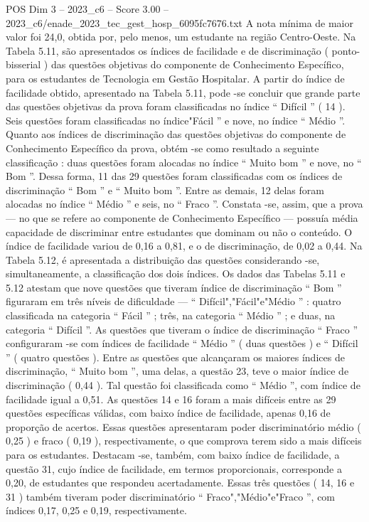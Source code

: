 \begin{textsample}{POS Dim 3 – 2023\_c6 – Score 3.00 – 2023\_c6/enade\_2023\_tec\_gest\_hosp\_6095fc7676.txt}
A nota mínima de maior valor foi 24,0, obtida por, pelo menos, um estudante na região Centro-Oeste.
Na Tabela 5.11, são apresentados os índices de facilidade e de discriminação ( ponto-bisserial ) das questões objetivas do componente de Conhecimento Específico, para os estudantes de Tecnologia em Gestão Hospitalar.
A partir do índice de facilidade obtido, apresentado na Tabela 5.11, pode -se concluir que grande parte das questões objetivas da prova foram classificadas no índice “ Difícil ” ( 14 ).
Seis questões foram classificadas no índice"Fácil ” e nove, no índice “ Médio ”.
Quanto aos índices de discriminação das questões objetivas do componente de Conhecimento Específico da prova, obtém -se como resultado a seguinte classificação : duas questões foram alocadas no índice “ Muito bom ” e nove, no “ Bom ”.
Dessa forma, 11 das 29 questões foram classificadas com os índices de discriminação “ Bom ” e “ Muito bom ”.
Entre as demais, 12 delas foram alocadas no índice “ Médio ” e seis, no “ Fraco ”.
Constata -se, assim, que a prova — no que se refere ao componente de Conhecimento Específico — possuía média capacidade de discriminar entre estudantes que dominam ou não o conteúdo.
O índice de facilidade variou de 0,16 a 0,81, e o de discriminação, de 0,02 a 0,44.
Na Tabela 5.12, é apresentada a distribuição das questões considerando -se, simultaneamente, a classificação dos dois índices.
Os dados das Tabelas 5.11 e 5.12 atestam que nove questões que tiveram índice de discriminação “ Bom ” figuraram em três níveis de dificuldade — “ Difícil","Fácil"e"Médio ” : quatro classificada na categoria “ Fácil ” ; três, na categoria “ Médio ” ; e duas, na categoria “ Difícil ”.
As questões que tiveram o índice de discriminação “ Fraco ” configuraram -se com índices de facilidade “ Médio ” ( duas questões ) e “ Difícil ” ( quatro questões ).
Entre as questões que alcançaram os maiores índices de discriminação, “ Muito bom ”, uma delas, a questão 23, teve o maior índice de discriminação ( 0,44 ).
Tal questão foi classificada como “ Médio ”, com índice de facilidade igual a 0,51.
As questões 14 e 16 foram a mais difíceis entre as 29 questões específicas válidas, com baixo índice de facilidade, apenas 0,16 de proporção de acertos.
Essas questões apresentaram poder discriminatório médio ( 0,25 ) e fraco ( 0,19 ), respectivamente, o que comprova terem sido a mais difíceis para os estudantes.
Destacam -se, também, com baixo índice de facilidade, a questão 31, cujo índice de facilidade, em termos proporcionais, corresponde a 0,20, de estudantes que respondeu acertadamente.
Essas três questões ( 14, 16 e 31 ) também tiveram poder discriminatório “ Fraco","Médio"e"Fraco ”, com índices 0,17, 0,25 e 0,19, respectivamente.

\end{textsample}
